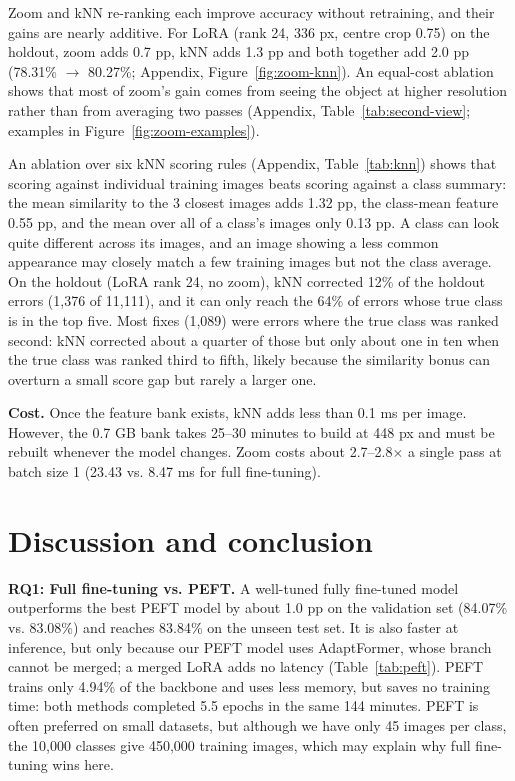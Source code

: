Zoom and kNN re-ranking each improve accuracy without retraining, and their gains are nearly additive. For LoRA (rank 24, 336 px, centre crop 0.75) on the holdout, zoom adds 0.7 pp, kNN adds 1.3 pp and both together add 2.0 pp (78.31\% $\rightarrow$ 80.27\%; Appendix, Figure~\ref{fig:zoom-knn}). An equal-cost ablation shows that most of zoom's gain comes from seeing the object at higher resolution rather than from averaging two passes (Appendix, Table~\ref{tab:second-view}; examples in Figure~\ref{fig:zoom-examples}).

An ablation over six kNN scoring rules (Appendix, Table~\ref{tab:knn}) shows that scoring against individual training images beats scoring against a class summary: the mean similarity to the 3 closest images adds 1.32 pp, the class-mean feature 0.55 pp, and the mean over all of a class's images only 0.13 pp. A class can look quite different across its images, and an image showing a less common appearance may closely match a few training images but not the class average. On the holdout (LoRA rank 24, no zoom), kNN corrected 12\% of the holdout errors (1,376 of 11,111), and it can only reach the 64\% of errors whose true class is in the top five. Most fixes (1,089) were errors where the true class was ranked second: kNN corrected about a quarter of those but only about one in ten when the true class was ranked third to fifth, likely because the similarity bonus can overturn a small score gap but rarely a larger one.

\textbf{Cost.} Once the feature bank exists, kNN adds less than 0.1 ms per image. However, the 0.7 GB bank takes 25--30 minutes to build at 448 px and must be rebuilt whenever the model changes. Zoom costs about 2.7--2.8$\times$ a single pass at batch size 1 (23.43 vs. 8.47 ms for full fine-tuning).

\section{Discussion and conclusion}\label{discussion-and-conclusion}

\textbf{RQ1: Full fine-tuning vs. PEFT.} A well-tuned fully fine-tuned model outperforms the best PEFT model by about 1.0 pp on the validation set (84.07\% vs. 83.08\%) and reaches 83.84\% on the unseen test set. It is also faster at inference, but only because our PEFT model uses AdaptFormer, whose branch cannot be merged; a merged LoRA adds no latency (Table~\ref{tab:peft}). PEFT trains only 4.94\% of the backbone and uses less memory, but saves no training time: both methods completed 5.5 epochs in the same 144 minutes. PEFT is often preferred on small datasets, but although we have only 45 images per class, the 10,000 classes give 450,000 training images, which may explain why full fine-tuning wins here.

